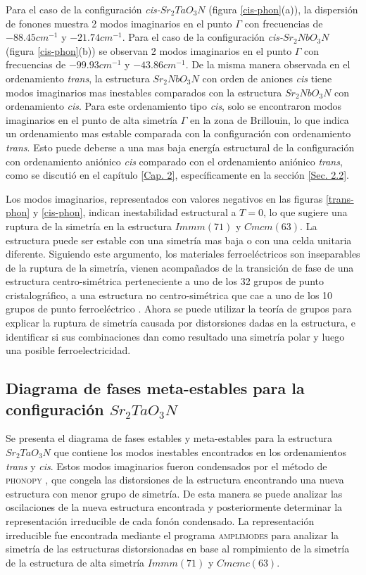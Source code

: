 Para el caso de la configuración \emph{cis-}$Sr_{2}TaO_{3}N$ (figura \ref{cis-phon}(a)), la dispersión de fonones muestra 2 modos imaginarios en el punto $\Gamma$ con frecuencias de $-88.45cm^{-1}$ y $-21.74cm^{-1}$. Para el caso de la configuración \emph{cis-}$Sr_{2}NbO_{3}N$ (figura \ref{cis-phon}(b)) se observan 2 modos imaginarios en el punto $\Gamma$ con frecuencias de $-99.93cm^{-1}$ y $-43.86cm^{-1}$. De la misma manera observada en el ordenamiento \emph{trans}, la estructura $Sr_{2}NbO_{3}N$ con orden de aniones \emph{cis} tiene modos imaginarios mas inestables comparados con la estructura $Sr_{2}NbO_{3}N$ con ordenamiento   \emph{cis}. Para este ordenamiento tipo \emph{cis}, solo se encontraron modos imaginarios en el punto de alta simetría $\Gamma$ en la zona de Brillouin, lo que indica un ordenamiento mas estable comparada con la configuración con ordenamiento \emph{trans}. Esto puede deberse a una mas baja energía estructural de la configuración con ordenamiento aniónico \emph{cis} comparado con el ordenamiento aniónico \emph{trans}, como se discutió en el capítulo \ref{Cap. 2}, específicamente en la sección \ref{Sec. 2.2}.

Los modos imaginarios, representados con valores negativos en las figuras \ref{trans-phon} y \ref{cis-phon}, indican inestabilidad estructural a $T=0$, lo que sugiere una ruptura de la simetría en la estructura $Immm(71)$ y $Cmcm(63)$. La estructura puede ser estable con una simetría mas baja o con una celda unitaria diferente. Siguiendo este argumento, los materiales ferroeléctricos son inseparables de la ruptura de la simetría, vienen acompañados de la transición de fase de una estructura centro-simétrica perteneciente a uno de los 32 grupos de punto cristalográfico, a una estructura no centro-simétrica que cae a uno de los 10 grupos de punto ferroeléctrico \cite{Shi2016SymmetryFerroelectrics}. Ahora se puede utilizar la teoría de grupos para explicar la ruptura de simetría causada por distorsiones dadas en la estructura, e identificar si sus combinaciones dan como resultado una simetría polar y luego una posible ferroelectricidad\cite{Yoshida2018HybridPhases}.


\subsection{Diagrama de fases meta-estables para la configuración $Sr_{2}TaO_{3}N$}

Se presenta el diagrama de fases estables y meta-estables para la estructura $Sr_{2}TaO_{3}N$ que contiene los modos inestables encontrados en los ordenamientos \emph{trans} y \emph{cis}. Estos modos imaginarios fueron condensados por el método de \textsc{phonopy} \cite{Togo2015phonopy}, que congela las distorsiones de la estructura encontrando una nueva estructura con menor grupo de simetría. De esta manera se puede analizar las oscilaciones de la nueva estructura encontrada y posteriormente determinar la representación irreducible de cada fonón condensado. La representación irreducible fue encontrada mediante el programa \textsc{amplimodes} \cite{Orobengoa2009amplimodes} para analizar la simetría de las estructuras distorsionadas en base al rompimiento de la simetría de la estructura de alta simetría $Immm(71)$ y $Cmcmc(63)$. 

